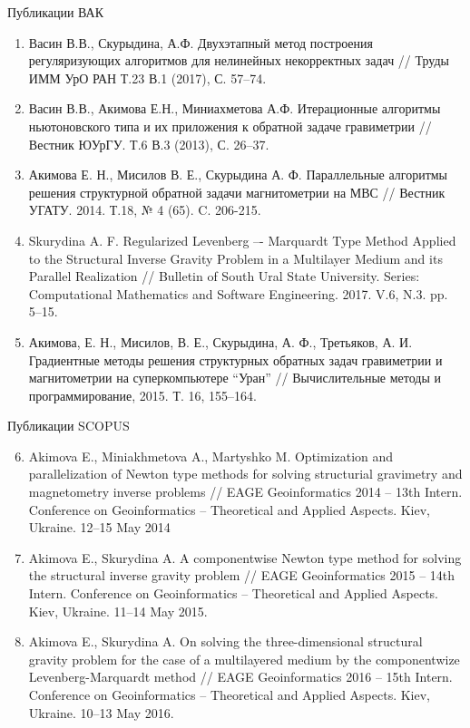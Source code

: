 \documentclass[10pt,pdf, mathserif, hyperref={unicode}]{beamer}
\begin{document}
\begin{frame}{Публикации ВАК}
\scriptsize
	\begin{enumerate}
		\item Васин В.В., Скурыдина, А.Ф. Двухэтапный метод построения регуляризующих алгоритмов для нелинейных некорректных задач // Труды ИММ УрО РАН Т.23 В.1 (2017), С. 57–74.
		\item Васин В.В., Акимова Е.Н., Миниахметова А.Ф. Итерационные алгоритмы ньютоновского типа и их приложения к обратной задаче гравиметрии // Вестник ЮУрГУ. Т.6 В.3 (2013), С. 26–37.
		\item Акимова Е. Н., Мисилов В. Е., Скурыдина А. Ф. Параллельные алгоритмы решения структурной обратной задачи магнитометрии на МВС // Вестник УГАТУ. 2014. Т.18, № 4 (65). C. 206-215.
		\item Skurydina A. F. Regularized Levenberg –- Marquardt Type Method Applied to the Structural 
Inverse Gravity Problem in a Multilayer Medium and its Parallel Realization // Bulletin of South Ural State University.
 Series: Computational Mathematics and Software Engineering. 2017. V.6, N.3. pp. 5--15.
		\item Акимова, Е. Н., Мисилов, В. Е., Скурыдина, А. Ф., Третьяков, А. И. Градиентные методы решения структурных обратных задач гравиметрии и магнитометрии 	на суперкомпьютере “Уран” // Вычислительные методы и программирование, 2015. Т. 16, 155–164.
	\end{enumerate}
\end{frame}
\begin{frame}{Публикации SCOPUS}
\scriptsize
	\begin{enumerate}
		\setcounter{enumi}{5}
		\item Akimova E., Miniakhmetova A., Martyshko M. Optimization and parallelization of Newton type methods for solving structurial gravimetry and magnetometry inverse problems // EAGE Geoinformatics 2014 – 13th Intern. Conference on Geoinformatics – Theoretical and Applied Aspects. Kiev, Ukraine. 12–15 May 2014
		\item Akimova E., Skurydina A. A componentwise Newton type method for solving the structural inverse gravity problem // EAGE Geoinformatics 2015 – 14th Intern. Conference on Geoinformatics – Theoretical and Applied Aspects. Kiev, Ukraine. 11–14 May 2015.
		\item Akimova E., Skurydina A. On solving the three-dimensional structural gravity problem for the case of a multilayered medium by the componentwize Levenberg-Marquardt method // EAGE Geoinformatics 2016 – 15th Intern. Conference on Geoinformatics – Theoretical and Applied Aspects. Kiev, Ukraine. 10–13 May 2016.
	\end{enumerate}
\end{frame}
\end{document}

